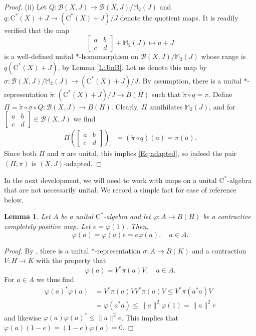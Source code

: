 \documentclass[10pt]{amsart}
\newcommand{\bM}{{\mathbb{M}}}
\newcommand{\B}{{\mathcal{B}}}
\newcommand{\rC}{\mathrm{C}}
\renewcommand{\phi}{\varphi}
\newtheorem{lemma}{Lemma}[section]
\theoremstyle{definition}
\begin{document}
\begin{proof}
(ii) Let $Q:\B(X,J)\to \B(X,J)/\bM_2(J)$  and $q:\rC^*(X)+J\to (\rC^*(X)+J)/J$ denote the quotient maps. 
It is readily verified that the map 
\[
\begin{bmatrix} a&  b\\ c & d\end{bmatrix}+\bM_2(J)\mapsto a+J
\]
is a well-defined unital $*$-homomorphism on  $\B(X,J)/\bM_2(J)$ whose range is $q(\rC^*(X)+J)$, by Lemma \ref{L:JinB}. Let us denote this map by $\sigma:\B(X,J)/\bM_2(J)\to (\rC^*(X)+J)/J$. 
By assumption, there is a unital $*$-representation $\widetilde\pi:(\rC^*(X)+J)/J\to B(H)$ such that $\widetilde\pi\circ q=\pi$. Define $\Pi=\widetilde\pi\circ \sigma\circ Q:\B(X,J)\to B(H)$. Clearly, $\Pi$ annihilates $\bM_2(J)$, and for $\begin{bmatrix} a & b \\ c& d\end{bmatrix}\in \B(X,J)$ we find
\begin{align*}
\Pi\left(\begin{bmatrix} a & b \\ c& d\end{bmatrix} \right)&=(\widetilde\pi\circ q)(a)=\pi(a).
\end{align*}
Since both $\Pi$ and $\pi$ are unital, this implies \eqref{Eq:adapted}, so indeed the pair $(\Pi,\pi)$ is $(X,J)$-adapted.
\end{proof}



In the next development, we will need to work with maps on a unital $\rC^*$-algebra that are not necessarily unital. We record a simple fact for ease of reference below.

\begin{lemma}\label{L:nonunital}
Let $A$ be a unital $\rC^*$-algebra and let $\phi:A\to B(H)$ be a contractive completely positive map. Let $e=\phi(1)$. Then,
\[
\phi(a)=\phi(a)e=e\phi(a), \quad a\in A.
\]
\end{lemma}
\begin{proof}
By \cite[Theorem 4.1]{paulsen2002completely}, there is a unital $*$-representation $\sigma:A\to B(K)$ and a contraction $V:H\to K$ with the property that
\[
\phi(a)=V^*\pi(a)V, \quad a\in A. 
\]
For $a\in A$ we thus find
\begin{align*}
\phi(a)^*\phi(a)&=V^*\pi(a)VV^*\pi(a)V\leq  V^*\pi(a^*a)V\\
&= \phi(a^*a)\leq \|a\|^2 \phi(1)=\|a\|^2 e
\end{align*}
and likewise $\phi(a)\phi(a)^*\leq \|a\|^2 e$. This implies
 that $\phi(a)(1-e)=(1-e)\phi(a)=0$.
\end{proof}
\end{document}
